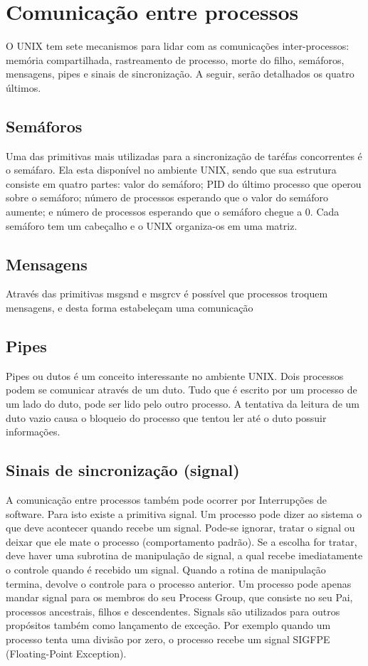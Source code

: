 \section{Comunicação entre processos}
O UNIX tem sete mecanismos para lidar com as comunicações inter-processos: memória compartilhada, rastreamento de processo, morte do filho, semáforos, mensagens, pipes e sinais de sincronização. A seguir, serão detalhados os quatro últimos.

\subsection{Semáforos}
Uma das primitivas mais utilizadas para a sincronização de taréfas concorrentes é o semáfaro. Ela esta disponível no ambiente UNIX, sendo que sua estrutura consiste em quatro partes: valor do semáforo; PID do último processo que operou sobre o semáforo; número de processos esperando que o valor do semáforo aumente; e número de processos esperando que o semáforo chegue a 0. Cada semáforo tem um cabeçalho e o UNIX organiza-os em uma matriz.

\subsection{Mensagens}
Através das primitivas msgsnd e msgrcv é possível que processos troquem mensagens, e desta forma estabeleçam uma comunicação

\subsection{Pipes}
Pipes ou dutos é um conceito interessante no ambiente UNIX. Dois processos podem se comunicar através de um duto. Tudo que é escrito por um processo de um lado do duto, pode ser lido pelo outro processo. A tentativa da leitura de um duto vazio causa o bloqueio do processo que tentou ler até o duto possuir informações.

\subsection{Sinais de sincronização (signal)}
A comunicação entre processos também pode ocorrer por Interrupções de software. Para isto existe a primitiva signal. Um processo pode dizer ao sistema o que deve acontecer quando recebe um signal. Pode-se ignorar, tratar o signal ou deixar que ele mate o processo (comportamento padrão). Se a escolha for tratar, deve haver uma subrotina de manipulação de signal, a qual recebe imediatamente o controle quando é recebido um signal. Quando a rotina de manipulação termina, devolve o controle para o processo anterior. Um processo pode apenas mandar signal para os membros do seu Process Group, que consiste no seu Pai, processos ancestrais, filhos e descendentes. 
Signals são utilizados para outros propósitos também como lançamento de exceção. Por exemplo quando um processo tenta uma divisão por zero, o processo recebe um signal SIGFPE (Floating-Point Exception).


